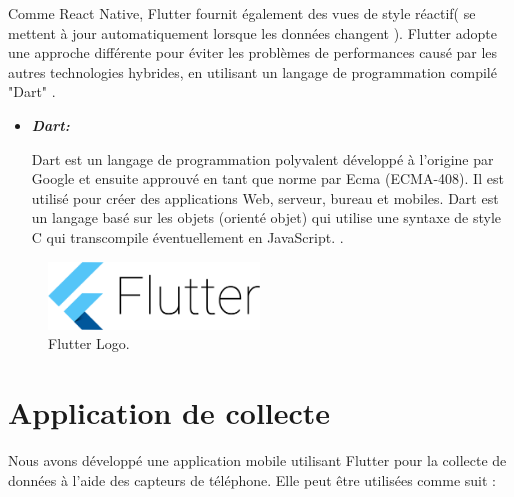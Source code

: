 Comme React Native\cite{ReactNativeFramework}, Flutter fournit également des vues de style réactif( se mettent à jour automatiquement lorsque les données changent ). Flutter adopte une approche différente pour éviter les problèmes de performances causé par les autres technologies hybrides, en utilisant un langage de programmation compilé "Dart" \cite{rahmouniBindex}.
\renewcommand{\labelitemi}{$\bullet$}
\begin{itemize}
    \item \textbf{\textit{Dart:}}

          Dart est un langage de programmation polyvalent développé à l’origine par Google et ensuite approuvé en tant que norme par Ecma (ECMA-408). Il est utilisé pour créer des applications Web, serveur, bureau et mobiles.
          Dart est un langage basé sur les objets (orienté objet) qui utilise une syntaxe de style C qui transcompile éventuellement en JavaScript. \cite{WhatRevolutionaryFlutter}.
\end{itemize}
\begin{figure}[h!]
    \center
    \includegraphics[width=0.50\textwidth]{Images/chapter3/flutter.png}
    \caption{Flutter Logo.}
    \label{fig:Technologies}
\end{figure}





\section{Application de collecte}
\label{sec:app_record}
Nous avons développé une application mobile utilisant Flutter pour la collecte de données à l'aide des capteurs de téléphone. Elle peut être utilisées comme suit :


